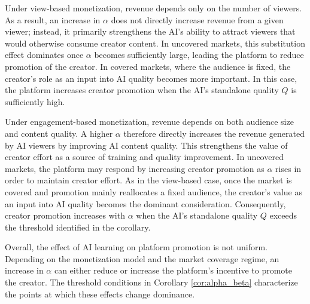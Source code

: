 Under view-based monetization, revenue depends only on the number of viewers. As a result, an increase in $\alpha$ does not directly increase revenue from a given viewer; instead, it primarily strengthens the AI's ability to attract viewers that would otherwise consume creator content. In uncovered markets, this substitution effect dominates once $\alpha$ becomes sufficiently large, leading the platform to reduce promotion of the creator. In covered markets, where the audience is fixed, the creator's role as an input into AI quality becomes more important. In this case, the platform increases creator promotion when the AI's standalone quality $Q$ is sufficiently high.

Under engagement-based monetization, revenue depends on both audience size and content quality. A higher $\alpha$ therefore directly increases the revenue generated by AI viewers by improving AI content quality. This strengthens the value of creator effort as a source of training and quality improvement. In uncovered markets, the platform may respond by increasing creator promotion as $\alpha$ rises in order to maintain creator effort. As in the view-based case, once the market is covered and promotion mainly reallocates a fixed audience, the creator's value as an input into AI quality becomes the dominant consideration. Consequently, creator promotion increases with $\alpha$ when the AI's standalone quality $Q$ exceeds the threshold identified in the corollary.

Overall, the effect of AI learning on platform promotion is not uniform. Depending on the monetization model and the market coverage regime, an increase in $\alpha$ can either reduce or increase the platform's incentive to promote the creator. The threshold conditions in Corollary \ref{cor:alpha_beta} characterize the points at which these effects change dominance.
